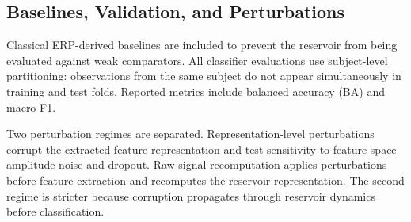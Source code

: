 \subsection{Baselines, Validation, and Perturbations}
Classical ERP-derived baselines are included to prevent the reservoir from being evaluated against weak comparators. All classifier evaluations use subject-level partitioning: observations from the same subject do not appear simultaneously in training and test folds. Reported metrics include balanced accuracy (BA) and macro-F1.

Two perturbation regimes are separated. Representation-level perturbations corrupt the extracted feature representation and test sensitivity to feature-space amplitude noise and dropout. Raw-signal recomputation applies perturbations before feature extraction and recomputes the reservoir representation. The second regime is stricter because corruption propagates through reservoir dynamics before classification.
